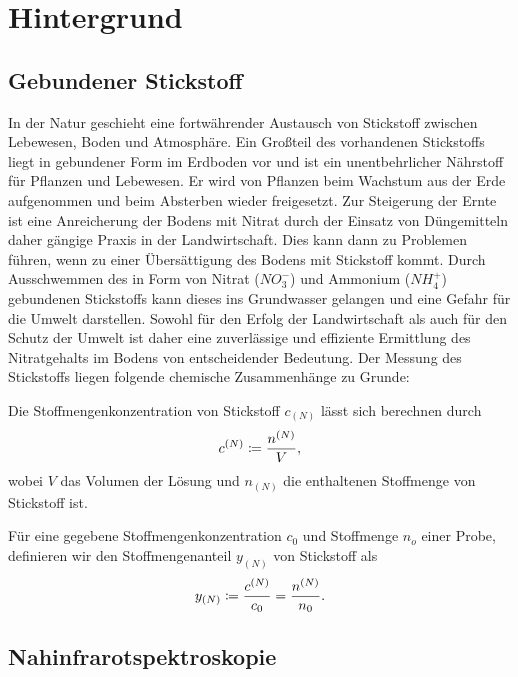 \section{Hintergrund}
\label{sec:Hintergrund}
	
	\subsection{Gebundener Stickstoff}
	\label{ssec:Gebundener Stickstoff}
	
	In der Natur geschieht eine fortwährender Austausch von Stickstoff zwischen Lebewesen, Boden und Atmosphäre. 
	Ein Großteil des vorhandenen Stickstoffs liegt in gebundener Form im Erdboden vor und ist ein unentbehrlicher Nährstoff für Pflanzen und Lebewesen.
	Er wird von Pflanzen beim Wachstum aus der Erde aufgenommen und beim Absterben wieder freigesetzt.
    Zur Steigerung der Ernte ist eine Anreicherung der Bodens mit Nitrat durch der Einsatz von Düngemitteln daher gängige Praxis in der Landwirtschaft.\cite{Umweltbundesamt2017}
    Dies kann dann zu Problemen führen, wenn zu einer Übersättigung des Bodens mit Stickstoff kommt.
    Durch Ausschwemmen des in Form von Nitrat ($NO_3^-$) und Ammonium ($NH_4^+$) gebundenen Stickstoffs kann dieses ins Grundwasser gelangen und eine Gefahr für die Umwelt darstellen.
    Sowohl für den Erfolg der Landwirtschaft als auch für den Schutz der Umwelt ist daher eine zuverlässige und effiziente Ermittlung des Nitratgehalts im Bodens von entscheidender Bedeutung.
    Der Messung des Stickstoffs liegen folgende chemische Zusammenhänge zu Grunde:
    
    
    Die Stoffmengenkonzentration von Stickstoff $c_{(N)}$ lässt sich berechnen durch
    	\[
			c^{(N)} \coloneqq \frac{n^{(N)}}{V},
		\]
		wobei $V$ das Volumen der Lösung und $n_{(N)}$ die enthaltenen Stoffmenge von Stickstoff ist.
		
    Für eine gegebene Stoffmengenkonzentration $c_0$  und Stoffmenge $n_o$ einer Probe, definieren wir den Stoffmengenanteil $y_{(N)}$ von Stickstoff als
        \[
			y_{(N)} \coloneqq \frac{c^{(N)}}{c_0} = \frac{n^{(N)}}{n_0}.
		\]
   

	\subsection{Nahinfrarotspektroskopie}
	\label{ssec:nirs}
	
